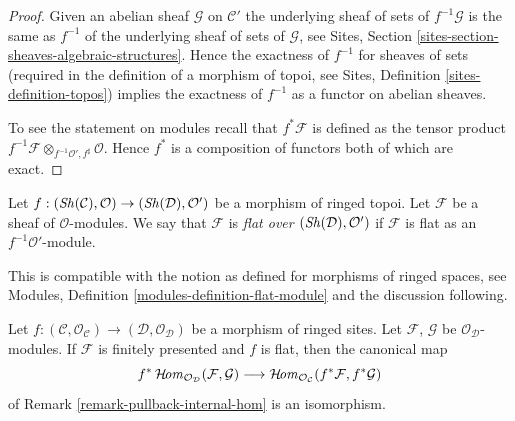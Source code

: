 \begin{proof}
Given an abelian sheaf $\mathcal{G}$ on $\mathcal{C}'$
the underlying sheaf of sets of $f^{-1}\mathcal{G}$ is the same
as $f^{-1}$ of the underlying sheaf of sets of $\mathcal{G}$, see
Sites, Section \ref{sites-section-sheaves-algebraic-structures}.
Hence the exactness of $f^{-1}$ for sheaves of sets (required in the
definition of a morphism of topoi, see
Sites, Definition \ref{sites-definition-topos})
implies the exactness of $f^{-1}$ as a functor on abelian sheaves.

\medskip\noindent
To see the statement on modules recall that $f^*\mathcal{F}$ is defined
as the tensor product
$f^{-1}\mathcal{F} \otimes_{f^{-1}\mathcal{O}', f^\sharp} \mathcal{O}$.
Hence $f^*$ is a composition of functors both of which are exact.
\end{proof}

\begin{definition}
\label{definition-flat-module}
Let $f : (\mathop{\mathit{Sh}}\nolimits(\mathcal{C}), \mathcal{O}) \to (\mathop{\mathit{Sh}}\nolimits(\mathcal{D}), \mathcal{O}')$
be a morphism of ringed topoi. Let $\mathcal{F}$ be a sheaf of
$\mathcal{O}$-modules. We say that $\mathcal{F}$ is
{\it flat over $(\mathop{\mathit{Sh}}\nolimits(\mathcal{D}), \mathcal{O}')$} if
$\mathcal{F}$ is flat as an $f^{-1}\mathcal{O}'$-module.
\end{definition}

\noindent
This is compatible with the notion as defined for morphisms of ringed spaces,
see Modules, Definition \ref{modules-definition-flat-module}
and the discussion following.

\begin{lemma}
\label{lemma-pullback-internal-hom}
Let $f : (\mathcal{C}, \mathcal{O}_\mathcal{C}) \to
(\mathcal{D}, \mathcal{O}_\mathcal{D})$ be a morphism
of ringed sites. Let $\mathcal{F}$, $\mathcal{G}$ be
$\mathcal{O}_\mathcal{D}$-modules.
If $\mathcal{F}$ is finitely presented and $f$ is flat,
then the canonical map
$$
f^*\mathop{\mathcal{H}\!\mathit{om}}\nolimits_{\mathcal{O}_\mathcal{D}}(\mathcal{F}, \mathcal{G})
\longrightarrow
\mathop{\mathcal{H}\!\mathit{om}}\nolimits_{\mathcal{O}_\mathcal{C}}(f^*\mathcal{F}, f^*\mathcal{G})
$$
of Remark \ref{remark-pullback-internal-hom} is an isomorphism.
\end{lemma}

